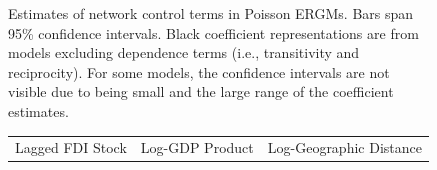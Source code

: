 \documentclass[reqno,onecolumn,letterpaper,12pt]{article}
\begin{document}
\begin{figure}[htp]
\begin{tabular}{@{\hskip -.05cm}c@{\hskip -.2cm}c@{\hskip -.2cm}c}
\end{tabular}
\caption{\label{fig:net_controls} Estimates of network control terms in Poisson ERGMs. Bars span 95\% confidence intervals. Black coefficient representations are from models excluding dependence terms (i.e., transitivity and reciprocity). For some models, the confidence intervals are not visible due to being small and the large range of the coefficient estimates.}
\end{figure}

\begin{figure}[htp]
\centering
\begin{tabular}{@{\hskip -.05cm}c@{\hskip -.2cm}c@{\hskip -.2cm}c}

Lagged FDI Stock&
Log-GDP Product &
Log-Geographic Distance\\


\end{tabular}
\end{figure}
\end{document}
